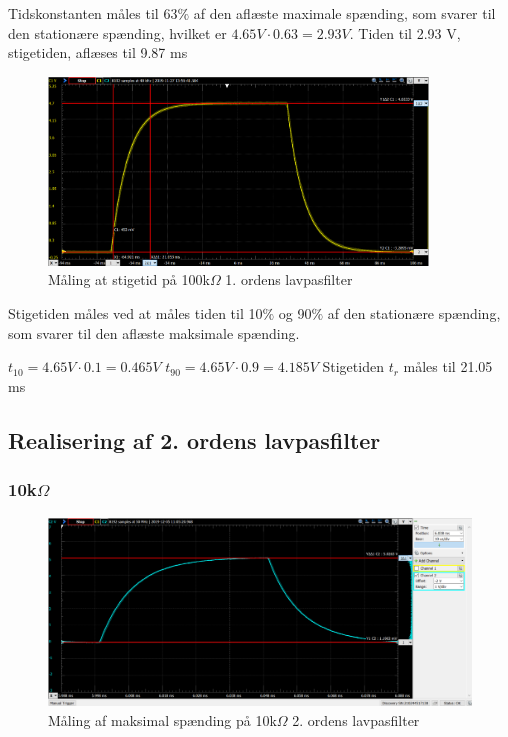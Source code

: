 \newpage

Tidskonstanten måles til 63$\%$ af den aflæste maximale spænding, som svarer til den stationære spænding, hvilket er $4.65 V \cdot 0.63 = 2.93 V$. Tiden til 2.93 V, stigetiden, aflæses til 9.87 ms

\begin{figure}[h!]
\begin{center}
\includegraphics[height=5cm]{E_Fig/Rea_1_100_stigetid}
\caption{Måling at stigetid på 100k$\Omega$ 1. ordens lavpasfilter}
\label{Rea_1_100_stigetid}
\end{center}
\end{figure}

Stigetiden måles ved at måles tiden til 10$\%$ og 90$\%$ af den stationære spænding, som svarer til den aflæste maksimale spænding. 

$t_{10}=4.65 V \cdot 0.1 = 0.465 V$
$t_{90}=4.65 V \cdot 0.9 = 4.185 V$
Stigetiden $t_r$ måles til 21.05 ms

\newpage
\subsection{Realisering af 2. ordens lavpasfilter}

\subsubsection{10k$\Omega$}

\begin{figure}[h!]
\begin{center}
\includegraphics[height=5cm]{E_Fig/Rea_2_10_max}
\caption{Måling af maksimal spænding på 10k$\Omega$ 2. ordens lavpasfilter}
\label{Rea_2_10_max}
\end{center}
\end{figure}

